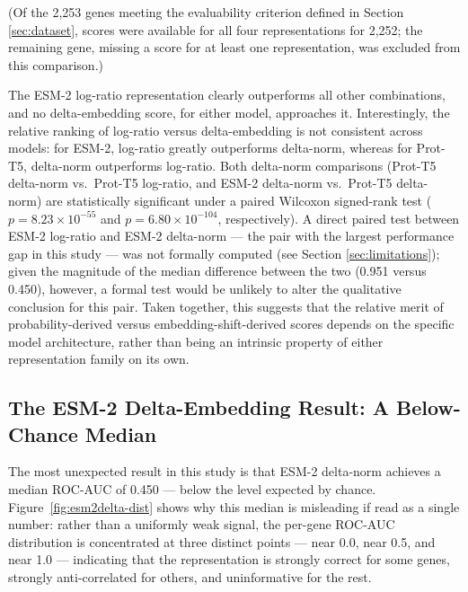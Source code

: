 \documentclass[12pt]{article}
\begin{document}
(Of the 2,253 genes meeting the evaluability criterion defined in Section \ref{sec:dataset}, scores were available for all four representations for 2,252; the remaining gene, missing a score for at least one representation, was excluded from this comparison.)

The ESM-2 log-ratio representation clearly outperforms all other combinations, and no delta-embedding score, for either model, approaches it. Interestingly, the relative ranking of log-ratio versus delta-embedding is not consistent across models: for ESM-2, log-ratio greatly outperforms delta-norm, whereas for Prot-T5, delta-norm outperforms log-ratio. Both delta-norm comparisons (Prot-T5 delta-norm vs.\ Prot-T5 log-ratio, and ESM-2 delta-norm vs.\ Prot-T5 delta-norm) are statistically significant under a paired Wilcoxon signed-rank test ($p = 8.23\times10^{-55}$ and $p = 6.80\times10^{-104}$, respectively). A direct paired test between ESM-2 log-ratio and ESM-2 delta-norm --- the pair with the largest performance gap in this study --- was not formally computed (see Section \ref{sec:limitations}); given the magnitude of the median difference between the two (0.951 versus 0.450), however, a formal test would be unlikely to alter the qualitative conclusion for this pair. Taken together, this suggests that the relative merit of probability-derived versus embedding-shift-derived scores depends on the specific model architecture, rather than being an intrinsic property of either representation family on its own.

\subsection{The ESM-2 Delta-Embedding Result: A Below-Chance Median}

The most unexpected result in this study is that ESM-2 delta-norm achieves a median ROC-AUC of 0.450 --- below the level expected by chance. Figure~\ref{fig:esm2delta-dist} shows why this median is misleading if read as a single number: rather than a uniformly weak signal, the per-gene ROC-AUC distribution is concentrated at three distinct points --- near 0.0, near 0.5, and near 1.0 --- indicating that the representation is strongly correct for some genes, strongly anti-correlated for others, and uninformative for the rest.
\end{document}
